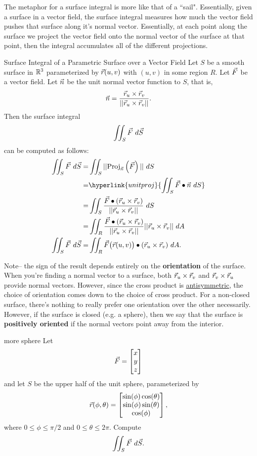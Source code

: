 The metaphor for a surface integral is more like that of a ``sail". Essentially, given a surface in a vector field, the surface integral measures how much the vector field pushes that surface along it's normal vector. Essentially, at each point along the surface we project the vector field onto the normal vector of the surface at that point, then the integral accumulates all of the different projections.

\begin{definition}{Surface Integral of a Parametric Surface over a Vector Field}
Let $S$ be a smooth surface in $\mathbb{R}^3$ parameterized by $\vec{r}(u,v)$ with $(u,v)$ in some region $R$. Let $\vec{F}$ be a vector field. Let $\vec{n}$ be the unit normal vector function to $S$, that is, $$\vec{n}=\frac{\vec{r}_u\times\vec{r}_v}{||\vec{r}_u\times\vec{r}_v||}.$$ Then the surface integral $$\iint_S \vcF \ d\vec{S} $$ can be computed as follows: 
\begin{align*}
\iint_S \vcF \ d\vec{S} =&\iint_S ||\proj{\vcF}{\vcn} || \ dS\\
=&\hyperlink{unitproj}{\iint_S \vcF\bullet\vcn \ dS}\\
=&\iint_S \frac{\vcF\bullet(\vcr_u\times\vcr_v)}{||\vcr_u\times\vcr_v||}\ dS\\
=&\iint_R \frac{\vcF\bullet(\vcr_u\times\vcr_v)}{||\vcr_u\times\vcr_v||}||\vcr_u\times\vcr_v||\ dA\\
\iint_S \vcF \ d\vec{S} =&\iint_R \vcF\big(\vcr(u,v)\big)\bullet(\vcr_u\times\vcr_v)\ dA.
\end{align*}
\end{definition}

Note-- the sign of the result depends entirely on the \textbf{orientation} of the surface. When you're finding a normal vector to a surface, both $\vec{r}_u\times\vec{r}_v$ and $\vec{r}_v\times\vec{r}_u$ provide normal vectors. However, since the cross product is \hyperlink{crossprop}{antisymmetric}, the choice of orientation comes down to the choice of cross product. For a non-closed surface, there's nothing to really prefer one orientation over the other necessarily. However, if the surface is closed (e.g. a sphere), then we say that the surface is \textbf{positively oriented} if the normal vectors point away from the interior.

\begin{exercise}{more sphere}
Let $$\vec{F}=\begin{bmatrix}x\\y\\z\end{bmatrix}$$ and let $S$ be the upper half of the unit sphere, parameterized by $$\vec{r}(\phi,\theta)=\begin{bmatrix}\sin(\phi)\cos(\theta)\\\sin(\phi)\sin(\theta)\\\cos(\phi)\end{bmatrix}, $$ where $0\leq\phi\leq \pi/2$ and $0\leq \theta\leq 2\pi$. Compute $$\iint_S \vec{F}\ d\vec{S}. $$
\end{exercise}

